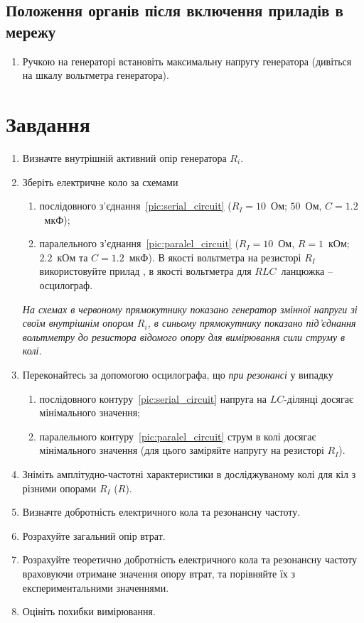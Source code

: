 \documentclass[]{LabWork}
\begin{document}
\subsection*{Положення органів після включення приладів в мережу}

\begin{enumerate}
	\item Ручкою  на генераторі  встановіть максимальну напругу генератора (дивіться на шкалу вольтметра генератора).
\end{enumerate}

\section{Завдання}

\begin{enumerate}
	\item Визначте внутрішній активний опір генератора $R_i$.
	\item Зберіть електричне коло за схемами
	      \begin{enumerate}[label=\alph*)]
		      \item послідовного з'єднання~\ref{pic:serial_circuit} ($R_I = 10$~Ом; $50$~Ом, $C = 1.2$~мкФ);
		      \item паралельного з'єднання~\ref{pic:paralel_circuit} ($R_I = 10$~Ом, $R = 1$~кОм; $2.2$~кОм та $C = 1.2$~мкФ). В якості вольтметра на резисторі $R_I$ використовуйте прилад , в якості вольтметра для $RLC$~ланцюжка -- осцилограф.
	      \end{enumerate}
	      {\small\itshape На схемах в червоному прямокутнику показано генератор змінної напруги зі своїм внутрішнім опором $R_i$, в синьому прямокутнику показано під'єднання вольтметру до резистора відомого опору для вимірювання сили струму в колі.}
	\item Переконайтесь за допомогою осцилографа, що \emph{при резонансі} у випадку
	      \begin{enumerate}[label=\alph*)]
		      \item послідовного контуру~\ref{pic:serial_circuit}  напруга на $LC$-ділянці досягає мінімального значення;
		      \item паралельного контуру~\ref{pic:paralel_circuit} струм в колі досягає мінімального значення (для цього заміряйте напругу на резисторі $R_I$).
	      \end{enumerate}
	\item Зніміть амплітудно-частотні характеристики в досліджуваному колі для кіл з різними опорами $R_I$ ($R$).
	\item Визначте добротність електричного кола та резонансну частоту.
	\item Розрахуйте загальний опір втрат.
	\item Розрахуйте теоретично добротність електричного кола та резонансну частоту враховуючи отримане значення опору втрат, та порівняйте їх з експериментальними значеннями.
	\item Оцініть похибки вимірювання.
\end{enumerate}
\end{document}

